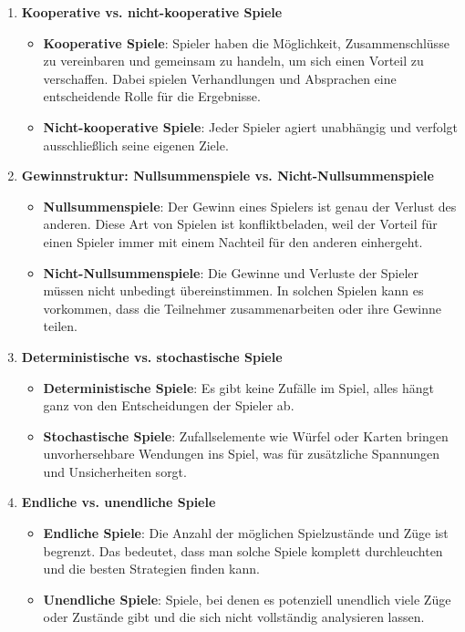 \begin{enumerate}
	\item \textbf{Kooperative vs. nicht-kooperative Spiele}
	\begin{itemize}
		\item \textbf{Kooperative Spiele}: Spieler haben die Möglichkeit, Zusammenschlüsse zu vereinbaren und gemeinsam zu handeln, um sich einen Vorteil zu verschaffen. Dabei spielen Verhandlungen und Absprachen eine entscheidende Rolle für die Ergebnisse.
		\item \textbf{Nicht-kooperative Spiele}: Jeder Spieler agiert unabhängig und verfolgt ausschließlich seine eigenen Ziele.
	\end{itemize}
	
	\item \textbf{Gewinnstruktur: Nullsummenspiele vs. Nicht-Nullsummenspiele}
	\begin{itemize}
		\item \textbf{Nullsummenspiele}: Der Gewinn eines Spielers ist genau der Verlust des anderen. Diese Art von Spielen ist konfliktbeladen, weil der Vorteil für einen Spieler immer mit einem Nachteil für den anderen einhergeht.
		\item \textbf{Nicht-Nullsummenspiele}: Die Gewinne und Verluste der Spieler müssen nicht unbedingt übereinstimmen. In solchen Spielen kann es vorkommen, dass die Teilnehmer zusammenarbeiten oder ihre Gewinne teilen.
	\end{itemize}
	
	\item \textbf{Deterministische vs. stochastische Spiele}
	\begin{itemize}
		\item \textbf{Deterministische Spiele}: Es gibt keine Zufälle im Spiel, alles hängt ganz von den Entscheidungen der Spieler ab.
		\item \textbf{Stochastische Spiele}: Zufallselemente wie Würfel oder Karten bringen unvorhersehbare Wendungen ins Spiel, was für zusätzliche Spannungen und Unsicherheiten sorgt.
	\end{itemize}
	
	\item \textbf{Endliche vs. unendliche Spiele}
	\begin{itemize}
		\item \textbf{Endliche Spiele}: Die Anzahl der möglichen Spielzustände und Züge ist begrenzt. Das bedeutet, dass man solche Spiele komplett durchleuchten und die besten Strategien finden kann.
		\item \textbf{Unendliche Spiele}: Spiele, bei denen es potenziell unendlich viele Züge oder Zustände gibt und die sich nicht vollständig analysieren lassen.
	\end{itemize}
\end{enumerate}

